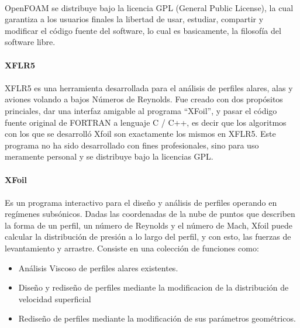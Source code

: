 \documentclass[letterpaper, openright, 12pt]{book}
\begin{document}
            \paragraph*{}
                OpenFOAM se distribuye bajo la licencia GPL (General Public
                License), la cual garantiza a los usuarios finales la libertad
                de usar, estudiar, compartir y modificar el código fuente del
                software, lo cual es basicamente, la filosofía del software
                libre.

            \paragraph*{XFLR5}
            \paragraph*{}
                XFLR5 es una herramienta desarrollada para el análisis de
                perfiles alares, alas y aviones volando a bajos Números de
                Reynolds. Fue creado con dos propósitos princiales, dar una
                interfaz amigable al programa ``XFoil'', y pasar el código
                fuente original de FORTRAN a lenguaje C / C++, es decir que los
                algoritmos con los que se desarrolló Xfoil son exactamente los
                mismos en XFLR5.\cite{xflr5} Este programa no ha sido
                desarrollado con fines profesionales, sino para uso meramente
                personal y se distribuye bajo la licencias GPL.

            \paragraph*{XFoil}
            \paragraph*{}
                Es un programa interactivo para el diseño y análisis de perfiles
                operando en regímenes subsónicos. Dadas las coordenadas de la
                nube de puntos que describen la forma de un perfil, un número de
                Reynolds y el número de Mach, Xfoil puede calcular la
                distribución de presión a lo largo del perfil, y con esto,
                las fuerzas de levantamiento y arrastre.
					Consiste en una colección de funciones como:
					\begin{itemize}
						\item Análisis Viscoso de perfiles alares existentes.
						\item Diseño y rediseño de perfiles mediante la modificacion de la distribución de velocidad superficial
						\item Rediseño de perfiles mediante la modificación de sus parámetros geométricos.
					\end{itemize}
				\cite{xfoil}
\end{document}
